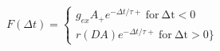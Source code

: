 $F(\Delta t) =  \begin{cases} g_{ex} A_{+} e^{−\Delta t/τ+}\:\mathrm{for\:\Delta t <0}\\r(DA) e^{−\Delta t/τ+}\:\mathrm{for\:\Delta t > 0}\} \end{cases}$
 